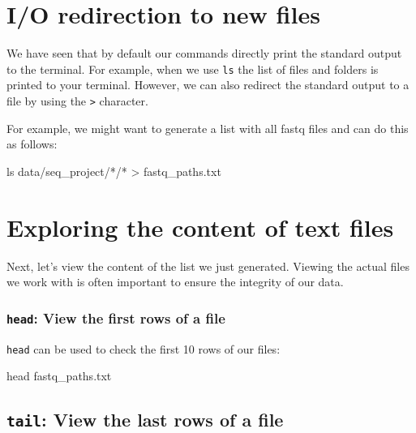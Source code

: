 \documentclass[
  letterpaper,
  DIV=11,
  numbers=noendperiod]{scrreprt}
\newenvironment{Shaded}{}{}
\newcommand{\FunctionTok}[1]{\textcolor[rgb]{0.44,0.26,0.76}{#1}}
\newcommand{\NormalTok}[1]{\textcolor[rgb]{0.14,0.16,0.18}{#1}}
\newcommand{\OperatorTok}[1]{\textcolor[rgb]{0.14,0.16,0.18}{#1}}
\newcommand{\PreprocessorTok}[1]{\textcolor[rgb]{0.84,0.23,0.29}{#1}}
\begin{document}
\section{I/O redirection to new
files}\label{io-redirection-to-new-files}

We have seen that by default our commands directly print the standard
output to the terminal. For example, when we use \texttt{ls} the list of
files and folders is printed to your terminal. However, we can also
redirect the standard output to a file by using the
\texttt{\textgreater{}} character.

For example, we might want to generate a list with all fastq files and
can do this as follows:

\begin{Shaded}
\begin{Highlighting}[]
\FunctionTok{ls}\NormalTok{ data/seq\_project/}\PreprocessorTok{*}\NormalTok{/}\PreprocessorTok{*} \OperatorTok{\textgreater{}}\NormalTok{ fastq\_paths.txt}
\end{Highlighting}
\end{Shaded}

\section{Exploring the content of text
files}\label{exploring-the-content-of-text-files}

Next, let's view the content of the list we just generated. Viewing the
actual files we work with is often important to ensure the integrity of
our data.

\subsubsection{\texorpdfstring{\texttt{head}: View the first rows of a
file}{head: View the first rows of a file}}\label{head-view-the-first-rows-of-a-file}

\texttt{head} can be used to check the first 10 rows of our files:

\begin{Shaded}
\begin{Highlighting}[]
\FunctionTok{head}\NormalTok{ fastq\_paths.txt}
\end{Highlighting}
\end{Shaded}

\subsection{\texorpdfstring{\texttt{tail}: View the last rows of a
file}{tail: View the last rows of a file}}\label{tail-view-the-last-rows-of-a-file}
\end{document}
